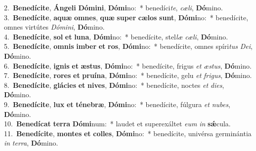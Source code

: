 {2.~}\textbf{Be}\textbf{ne}\textbf{dí}\textbf{ci}\textbf{te}, \textbf{Án}\textbf{ge}\textbf{li} \textbf{Dó}\textbf{mi}\textbf{ni}, \textbf{Dó}\textbf{mi}no:~* benedíci\textit{te}, \textit{cæ}\textit{li}, \textbf{Dó}mino.\\
{3.~}\textbf{Be}\textbf{ne}\textbf{dí}\textbf{ci}\textbf{te}, \textbf{a}\textbf{quæ} \textbf{om}\textbf{nes}, \textbf{quæ} \textbf{su}\textbf{per} \textbf{cæ}\textbf{los} \textbf{sunt}, \textbf{Dó}\textbf{mi}no:~* benedícite, omnes virtútes \textit{Dó}\textit{mi}\textit{ni}, \textbf{Dó}mino.\\
{4.~}\textbf{Be}\textbf{ne}\textbf{dí}\textbf{ci}\textbf{te}, \textbf{sol} \textbf{et} \textbf{lu}\textbf{na}, \textbf{Dó}\textbf{mi}no:~* benedícite, stel\textit{læ} \textit{cæ}\textit{li}, \textbf{Dó}mino.\\
{5.~}\textbf{Be}\textbf{ne}\textbf{dí}\textbf{ci}\textbf{te}, \textbf{om}\textbf{nis} \textbf{im}\textbf{ber} \textbf{et} \textbf{ros}, \textbf{Dó}\textbf{mi}no:~* benedícite, omnes spíri\textit{tus} \textit{De}\textit{i}, \textbf{Dó}mino.\\
{6.~}\textbf{Be}\textbf{ne}\textbf{dí}\textbf{ci}\textbf{te}, \textbf{i}\textbf{gnis} \textbf{et} \textbf{æ}\textbf{stus}, \textbf{Dó}\textbf{mi}no:~* benedícite, frigus \textit{et} \textit{æ}\textit{stus}, \textbf{Dó}mino.\\
{7.~}\textbf{Be}\textbf{ne}\textbf{dí}\textbf{ci}\textbf{te}, \textbf{ro}\textbf{res} \textbf{et} \textbf{pru}\textbf{í}\textbf{na}, \textbf{Dó}\textbf{mi}no:~* benedícite, gelu \textit{et} \textit{fri}\textit{gus}, \textbf{Dó}mino.\\
{8.~}\textbf{Be}\textbf{ne}\textbf{dí}\textbf{ci}\textbf{te}, \textbf{glá}\textbf{ci}\textbf{es} \textbf{et} \textbf{ni}\textbf{ves}, \textbf{Dó}\textbf{mi}no:~* benedícite, noctes \textit{et} \textit{di}\textit{es}, \textbf{Dó}mino.\\
{9.~}\textbf{Be}\textbf{ne}\textbf{dí}\textbf{ci}\textbf{te}, \textbf{lux} \textbf{et} \textbf{té}\textbf{ne}\textbf{bræ}, \textbf{Dó}\textbf{mi}no:~* benedícite, fúlgura \textit{et} \textit{nu}\textit{bes}, \textbf{Dó}mino.\\
{10.~}\textbf{Be}\textbf{ne}\textbf{dí}\textbf{cat} \textbf{ter}\textbf{ra} \textbf{Dó}\textbf{mi}num:~* laudet et superexáltet \textit{e}\textit{um} \textit{in} \textbf{sǽ}cula.\\
{11.~}\textbf{Be}\textbf{ne}\textbf{dí}\textbf{ci}\textbf{te}, \textbf{mon}\textbf{tes} \textbf{et} \textbf{col}\textbf{les}, \textbf{Dó}\textbf{mi}no:~* benedícite, univérsa germinántia \textit{in} \textit{ter}\textit{ra}, \textbf{Dó}mino.\\
